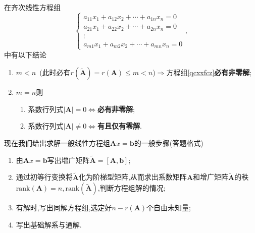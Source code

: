 \documentclass[9pt,a4paper]{book}
\begin{document}
\begin{inference}
	在齐次线性方程组
	\begin{equation}\label{qcxxfcz}
	\left\{
	\begin{array}{c}
	a_{11}x_1+a_{12}x_2+\cdots+a_{1n}x_n=0\\
	a_{21}x_1+a_{22}x_2+\cdots+a_{2n}x_n=0\\
	\vdots \\
	a_{m1}x_1+a_{m2}x_2+\cdots+a_{mn}x_n=0
	\end{array}
	\right.,
	\end{equation}
	中有以下结论
	\begin{enumerate}
		\item $ m<n$\ (此时必有$ r(\widetilde{\bm{A}})=r(\bm{A})\leqslant m<n $)$\Rightarrow $方程组\ref{qcxxfcz}\textbf{必有非零解};
		\item $ m=n$则
			\begin{enumerate}
			\item 系数行列式$ |\bm{A}|=0 \Leftrightarrow$\textbf{必有非零解};
			\item 系数行列式$ |\bm{A}|\neq0 \Leftrightarrow$\textbf{有且仅有零解}.
			\end{enumerate}
	\end{enumerate}
\end{inference}
\begin{method}
	现在我们给出求解一般线性方程组$ \bm{A}x=\bm{b} $的一般步骤(答题格式)
	\begin{enumerate}
		\item 由$ \bm{A}x=\bm{b} $写出增广矩阵$ \widetilde{\bm{A}}=[\bm{A},\bm{b}] $;
		\item 通过初等行变换将$ \widetilde{\bm{A}} $化为阶梯型矩阵,从而求出系数矩阵$ \bm{A} $和增广矩阵$ \widetilde{\bm{A}} $的秩$\mathrm{rank}(\bm{A})=n,\mathrm{rank}(\widetilde{\bm{A}})$,判断方程组解的情况;
		\item 有解时,写出同解方程组,选定好$ n-r(\bm{A}) $个自由未知量;
		\item 写出基础解系与通解.
	\end{enumerate}
\end{method}
\end{document}
